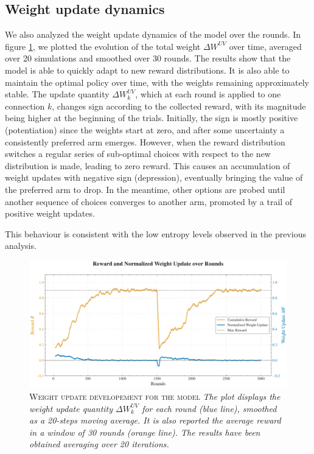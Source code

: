 \subsection{Weight update dynamics}
\noindent We also analyzed the weight update dynamics of the model over the rounds.
In figure \ref{fig:rew_update}, we plotted the evolution of the total weight $\Delta W^{UV}$ over time, averaged over 20 simulations and smoothed over 30 rounds.
The results show that the model is able to quickly adapt to new reward distributions. It is also able to maintain the optimal policy over time, with the weights remaining approximately stable.
The update quantity $\Delta W_{k}^{UV}$, which at each round is applied to one connection $k$, changes sign according to the collected reward, with its magnitude being higher at the beginning of the trials.
Initially, the sign is mostly positive (potentiation) since the weights start at zero, and after some uncertainty a consistently preferred arm emerges.
However, when the reward distribution switches a regular series of sub-optimal choices with respect to the new distribution is made, leading to zero reward.
This causes an accumulation of weight updates with negative sign (depression), eventually bringing the value of the preferred arm to drop. In the meantime, other options are probed until another sequence of choices converges to another arm, promoted by a trail of positive weight updates.

This behaviour is consistent with the low entropy levels observed in the previous analysis.


\begin{figure}[H]
    \centering
    \includegraphics[width=1.0\textwidth]{figures/reward_update_plot.pdf}
    \caption{\textsc{Weight update developement for the model} \textit{The plot displays the weight update quantity $\Delta W_{k}^{UV}$ for each round (blue line), smoothed as a 20-steps moving average.
    It is also reported the average reward in a window of 30 rounds (orange line). The results have been obtained averaging over 20 iterations.}}
    \label{fig:rew_update}
\end{figure}


